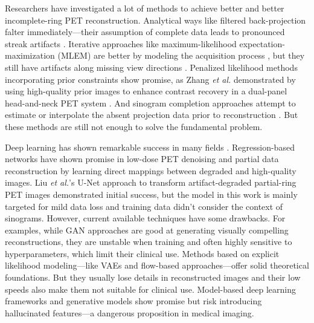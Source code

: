 \documentclass[12pt]{iopart}
\begin{document}
Researchers have investigated a lot of methods to achieve better and better incomplete-ring PET reconstruction. Analytical ways like filtered back-projection falter immediately—their assumption of complete data leads to pronounced streak artifacts \cite{kak1988}. Iterative approaches like maximum-likelihood expectation-maximization (MLEM) are better by modeling the acquisition process \cite{qi2006}, but they still have artifacts along missing view directions \cite{zhang2020}.
Penalized likelihood methods incorporating prior constraints show promise, as Zhang \textit{et al.} demonstrated by using high-quality prior images to enhance contrast recovery in a dual-panel head-and-neck PET system \cite{zhang2020}. And sinogram completion approaches attempt to estimate or interpolate the absent projection data prior to reconstruction \cite{makkar2024partial}. But these methods are still not enough to solve the fundamental problem. 

Deep learning has shown remarkable success in many fields \cite{PhysRevD.110.063011, liu2024deep, reader2020deep}. Regression-based networks have shown promise in low-dose PET denoising and partial data reconstruction \cite{Kandarpa_2021} by learning direct mappings between degraded and high-quality images. Liu \textit{et al.}'s U-Net approach to transform artifact-degraded partial-ring PET images \cite{liu2019} demonstrated initial success, but the model in this work is mainly targeted for mild data loss and training data didn't consider the context of sinograms.
However, current available techniques have some drawbacks.
For examples, while GAN approaches are good at generating visually compelling reconstructions, \cite{xue2023cg3dsrganclassificationguided3d} they are unstable when training and often highly sensitive to hyperparameters, which limit their clinical use.
Methods based on explicit likelihood modeling—like VAEs and flow-based approaches—offer solid theoretical foundations. But they usually lose details in reconstructed images and their low speeds also make them not suitable for clinical use.
Model-based deep learning frameworks and generative models \cite{reader2023, vashistha2024} show promise but risk introducing hallucinated features—a dangerous proposition in medical imaging.
\end{document}
